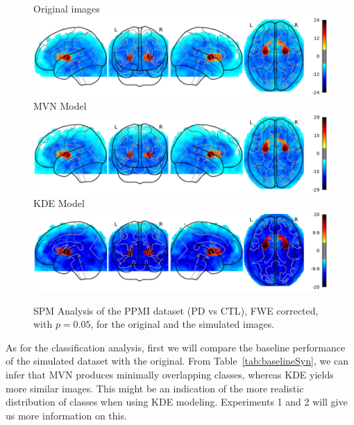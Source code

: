 \begin{figure}
	\centering
	Original \ppmidat{} images\\
	\includegraphics[width=\linewidth]{Graphics/ch8/NORvsPD_Orig_glass}\\
	\ac{MVN} Model\\
	\includegraphics[width=\linewidth]{Graphics/ch8/NORvsPD_MVN_glass}\\
	\ac{KDE} Model\\
	\includegraphics[width=\linewidth]{Graphics/ch8/NORvsPD_KDE_glass}
	\caption[\acs{SPM} Analysis of the \acs{PPMI} dataset.]{\ac{SPM} Analysis of the \acs{PPMI} dataset (\ac{PD} vs \ac{CTL}), \ac{FWE} corrected, with $p=0.05$, for the original and the simulated images.}
	\label{fig:spmPKS}
\end{figure}

As for the classification analysis, first we will compare the baseline performance of the simulated dataset with the original. From Table~\ref{tab:baselineSyn}, we can infer that \ac{MVN} produces minimally overlapping classes, whereas \ac{KDE} yields more similar images. This might be an indication of the more realistic distribution of classes when using \ac{KDE} modeling. Experiments 1 and 2 will give us more information on this.

